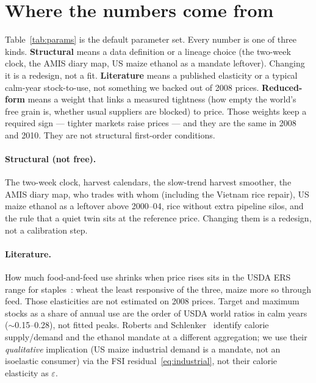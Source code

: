 \documentclass[11pt,a4paper]{article}
\begin{document}


\section{Where the numbers come from}
\label{sec:params}

Table~\ref{tab:params} is the default parameter set. Every number is one of
three kinds. \textbf{Structural} means a data definition or a lineage
choice (the two-week clock, the AMIS diary map, US maize ethanol as a
mandate leftover). Changing it is a redesign, not a fit. \textbf{Literature}
means a published elasticity or a typical calm-year stock-to-use, not
something we backed out of 2008 prices. \textbf{Reduced-form} means a
weight that links a measured tightness (how empty the world's free grain
is, whether usual suppliers are blocked) to price. Those weights keep a
required sign --- tighter markets raise prices --- and they are the same
in 2008 and 2010. They are not structural first-order conditions.

\begin{table}[H]
\centering
\caption{Gate~0 defaults. Shared knobs are identical across crops unless
a crop reason is written down. Nothing is fit to a single crisis year.}
\label{tab:params}
\small

\end{table}

\paragraph{Structural (not free).}
The two-week clock, harvest calendars, the slow-trend harvest smoother, the
AMIS diary map, who trades with whom (including the Vietnam rice repair),
US maize ethanol as a leftover above 2000--04, rice without extra pipeline
silos, and the rule that a quiet twin sits at the reference price. Changing
them is a redesign, not a calibration step.

\paragraph{Literature.}
How much food-and-feed use shrinks when price rises sits in the USDA ERS
range for staples~\citep{muhammad2011}: wheat the least responsive of the
three, maize more so through feed. Those elasticities are not estimated on
2008 prices. Target and maximum stocks as a share of annual use are the
order of USDA world ratios in calm years ($\sim$0.15--0.28), not fitted
peaks.
Roberts and Schlenker~\citep{roberts2013} identify calorie supply/demand
and the ethanol mandate at a different aggregation; we use their
\emph{qualitative} implication (US maize industrial demand is a mandate,
not an isoelastic consumer) via the FSI residual~\eqref{eq:industrial},
not their calorie elasticity as $\varepsilon$.
\end{document}
